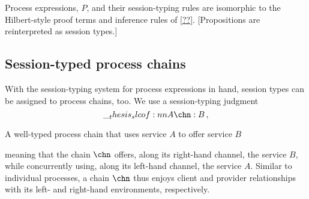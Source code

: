 Process expressions, $P$, and their session-typing rules are isomorphic to the Hilbert-style proof terms and inference rules of \cref{??}.
[Propositions are reinterpreted as session types.]




\subsection{Session-typed process chains}

With the session-typing system for process expressions in hand, session types can be assigned to process chains, too.
We use a session-typing judgment
\begin{equation*}
  \slcof{A |- \chn : B} \,,
\end{equation*}
%
\begin{marginfigure}[-4\baselineskip]
  \centering
  \caption{A well-typed process chain that uses service $A$ to offer service $B$}\label{fig:singleton-processes:well-typed-chain}
\end{marginfigure}%
%
meaning that the chain $\chn$ offers, along its right-hand channel, the service $B$, while concurrently using, along its left-hand channel, the service $A$.
Similar to individual processes, a chain $\chn$ thus enjoys client and provider relationships with its left- and right-hand environments, respectively.

